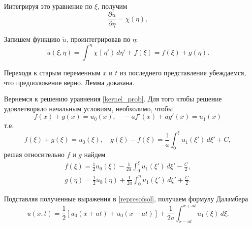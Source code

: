 Интегрируя это уравнение по $\xi$, получим
\begin{equation*}
	\frac{\partial \tilde{u}}{\partial \eta} = \chi(\eta),
\end{equation*}

Запишем функцию $\tilde{u}$, проинтегрировав по $\eta$:
\begin{equation*}
	\tilde{u}(\xi, \eta) = \int^{\eta} \chi(\eta') \, d\eta' + f(\xi) = f(\xi) + g(\eta).
\end{equation*}

Переходя к старым переменным $x$ и $t$ из последнего представления убеждаемся, что предположение верно. Лемма доказана.  


Вернемся к решению уравнения \eqref{kernel_prob}. Для того чтобы решение удовлетворяло начальным условиям, необхолимо, чтобы
\begin{equation*}
	f(x) + g(x) = u_0(x), \quad -a f'(x) + a g'(x) = u_1(x)
\end{equation*}
т.е. 
\begin{equation*}
	f(\xi) + g(\xi) = u_0(\xi), \quad g(\xi) - f(\xi) = \frac{1}{a} \int_{0}^{\xi} u_1(\xi') \, d\xi' + C,
\end{equation*}
решая относительно $f$ и $g$ найдем
\begin{align*}
	f(\xi) = \frac{1}{2} u_0(\xi) - \frac{1}{2 a} \int_{0}^{\xi} u_1(\xi') \, d\xi' - \frac{C}{2}, \\
	g(\eta) = \frac{1}{2} u_0(\eta) + \frac{1}{2 a} \int_{0}^{\eta} u_1(\xi') \, d\xi' + \frac{C}{2}.
\end{align*}

Подставляя полученные выражения в \eqref{represofsol}, получаем формулу Даламбера
\begin{equation*}
	u(x, t) = \frac{1}{2} [u_0(x + a t) + u_0(x - a t)] + \frac{1}{2 a} \int_{x - a t}^{x + a t} u_1(\xi) \, d\xi.
\end{equation*}